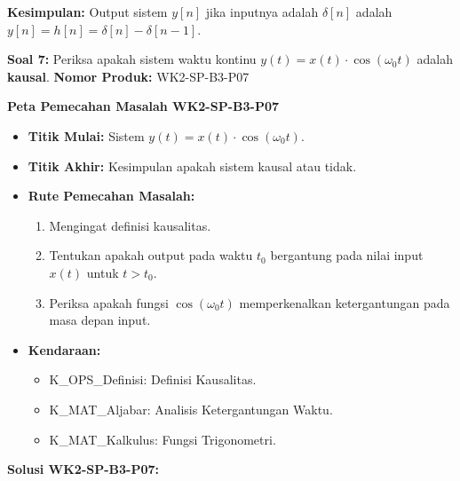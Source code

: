 \documentclass[
  letterpaper,
  DIV=11,
  numbers=noendperiod]{scrreprt}
\providecommand{\tightlist}{%
  \setlength{\itemsep}{0pt}\setlength{\parskip}{0pt}}
\begin{document}
\textbf{Kesimpulan:} Output sistem \(y[n]\) jika inputnya adalah
\(\delta[n]\) adalah \(y[n] = h[n] = \delta[n] - \delta[n-1]\).

\textbf{Soal 7:} Periksa apakah sistem waktu kontinu
\(y(t) = x(t) \cdot \cos(\omega_0 t)\) adalah \textbf{kausal}.
\textbf{Nomor Produk:} WK2-SP-B3-P07

\textbf{Peta Pemecahan Masalah WK2-SP-B3-P07}

\begin{itemize}
\tightlist
\item
  \textbf{Titik Mulai:} Sistem \(y(t) = x(t) \cdot \cos(\omega_0 t)\).
\item
  \textbf{Titik Akhir:} Kesimpulan apakah sistem kausal atau tidak.
\item
  \textbf{Rute Pemecahan Masalah:}

  \begin{enumerate}
  \def\labelenumi{\arabic{enumi}.}
  \tightlist
  \item
    Mengingat definisi kausalitas.
  \item
    Tentukan apakah output pada waktu \(t_0\) bergantung pada nilai
    input \(x(t)\) untuk \(t > t_0\).
  \item
    Periksa apakah fungsi \(\cos(\omega_0 t)\) memperkenalkan
    ketergantungan pada masa depan input.
  \end{enumerate}
\item
  \textbf{Kendaraan:}

  \begin{itemize}
  \tightlist
  \item
    K\_OPS\_Definisi: Definisi Kausalitas.
  \item
    K\_MAT\_Aljabar: Analisis Ketergantungan Waktu.
  \item
    K\_MAT\_Kalkulus: Fungsi Trigonometri.
  \end{itemize}
\end{itemize}

\textbf{Solusi WK2-SP-B3-P07:}
\end{document}

